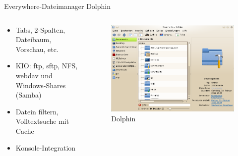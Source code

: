 \begin{frame}{Everywhere-Dateimanager Dolphin}
  \begin{columns}
    \begin{column}{0.45\textwidth}
      \begin{itemize}
        \item Tabs, 2-Spalten, Dateibaum, Vorschau, etc.
        \item KIO: ftp, sftp, NFS, webdav und Windows-Shares (Samba)
        \item Datein filtern, Volltextsuche mit Cache
        \item Konsole-Integration
      \end{itemize}      
    \end{column}
    \begin{column}{0.55\textwidth}
      \begin{figure}
        \includegraphics[keepaspectratio=true,width=\textwidth]{dolphin}
        \caption{Dolphin}
      \end{figure}
    \end{column}
  \end{columns}
\end{frame}

